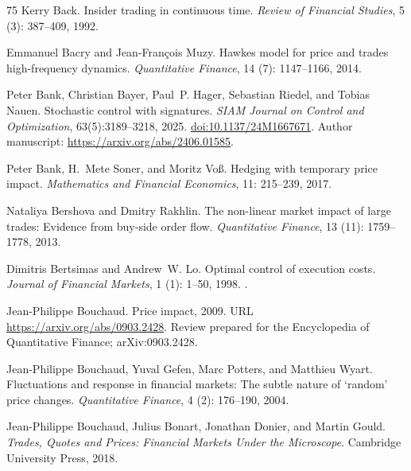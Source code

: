 \documentclass[11pt]{article}
\numberwithin{equation}{section}
\theoremstyle{definition}
\theoremstyle{remark}
\theoremstyle{definition}
\begin{document}
\begin{thebibliography}{75}
Kerry Back.
\newblock Insider trading in continuous time.
\newblock \emph{Review of Financial Studies}, 5 (3):
  387--409, 1992.

Emmanuel Bacry and Jean-Fran{\c c}ois Muzy.
\newblock Hawkes model for price and trades high-frequency dynamics.
\newblock \emph{Quantitative Finance}, 14 (7): 1147--1166,
  2014.

Peter Bank, Christian Bayer, Paul~P. Hager, Sebastian Riedel, and Tobias Nauen.
\newblock Stochastic control with signatures.
\newblock \emph{SIAM Journal on Control and Optimization}, 63(5):3189--3218, 2025.
\newblock \href{https://doi.org/10.1137/24M1667671}{doi:10.1137/24M1667671}.
\newblock Author manuscript: \url{https://arxiv.org/abs/2406.01585}.

Peter Bank, H.~Mete Soner, and Moritz Vo{\ss}.
\newblock Hedging with temporary price impact.
\newblock \emph{Mathematics and Financial Economics}, 11: 215--239,
  2017.

Nataliya Bershova and Dmitry Rakhlin.
\newblock The non-linear market impact of large trades: Evidence from buy-side
  order flow.
\newblock \emph{Quantitative Finance}, 13 (11): 1759--1778,
  2013.

Dimitris Bertsimas and Andrew~W. Lo.
\newblock Optimal control of execution costs.
\newblock \emph{Journal of Financial Markets}, 1 (1): 1--50,
  1998.
\newblock {}.

Jean-Philippe Bouchaud.
\newblock Price impact, 2009.
\newblock URL \url{https://arxiv.org/abs/0903.2428}.
\newblock Review prepared for the Encyclopedia of Quantitative Finance;
  arXiv:0903.2428.

Jean-Philippe Bouchaud, Yuval Gefen, Marc Potters, and Matthieu Wyart.
\newblock Fluctuations and response in financial markets: The subtle nature of
  `random' price changes.
\newblock \emph{Quantitative Finance}, 4 (2): 176--190, 2004.

Jean-Philippe Bouchaud, Julius Bonart, Jonathan Donier, and Martin Gould.
\newblock \emph{Trades, Quotes and Prices: Financial Markets Under the
  Microscope}.
\newblock Cambridge University Press, 2018.


\end{thebibliography}
\end{document}
